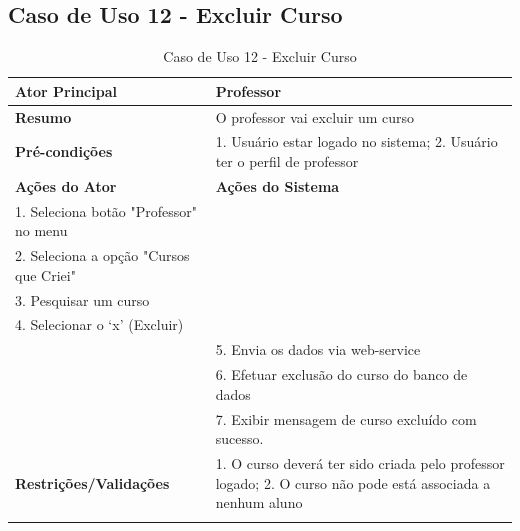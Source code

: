 \subsection{Caso de Uso 12 - Excluir Curso}
\label{sc:case12}
\begin{center}
\begin{longtable}{p{8cm}|p{8cm}}
    \hline
    \textbf{Ator Principal} & Professor \\
    \hline
    \textbf{Resumo} & O professor vai excluir um curso \\
    \hline
    \textbf{Pr\'{e}-condi\c{c}\~{o}es} & 1. Usuário estar logado no sistema; 2. Usuário ter o perfil de professor \\
    \hline
    \textbf{A\c{c}\~{o}es do Ator} & \textbf{A\c{c}\~{o}es do Sistema} \\
    \hline
    1. Seleciona botão "Professor" no menu \\
    \hline
    2. Seleciona a opção "Cursos que Criei" \\
	\hline
    3. Pesquisar um curso \\
	\hline
    4. Selecionar o ‘x’ (Excluir) \\
    \hline
    & 5. Envia os dados via web-service \\
	\hline
    & 6. Efetuar exclusão do curso do banco de dados \\
	\hline
    & 7. Exibir mensagem de curso excluído com sucesso. \\
    \hline
    \hline
    \textbf{Restri\c{c}\~{o}es/Valida\c{c}\~{o}es} & 1. O curso deverá ter sido criada pelo professor logado; 2. O curso não pode está associada a nenhum aluno \\
\hline
\caption{Caso de Uso 12 - Excluir Curso}
\end{longtable}
\end{center}

